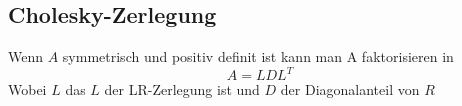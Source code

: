 \subsection{Cholesky-Zerlegung}
Wenn $A$ symmetrisch und positiv definit ist kann man A faktorisieren in 
$$
	A=LDL^T
$$
Wobei $L$ das $L$ der LR-Zerlegung ist und $D$ der Diagonalanteil von $R$











